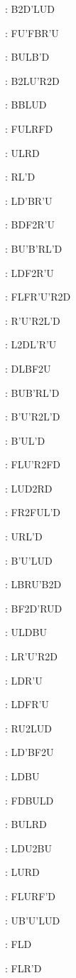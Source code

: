 \documentclass[9pt]{article}
\begin{document}
{\begin{multicols}{6}
: B2D'LUD

: FU'FBR'U

: BULB'D

: B2LU'R2D

: BBLUD

: FULRFD

: ULRD

: RL'D

: LD'BR'U

: BDF2R'U

: BU'B'RL'D

: LDF2R'U

: FLFR'U'R2D

: R'U'R2L'D

: L2DL'R'U

: DLBF2U

: BUB'RL'D

: B'U'R2L'D

: B'UL'D

: FLU'R2FD

: LUD2RD

: FR2FUL'D

: URL'D

: B'U'LUD

: LBRU'B2D

: BF2D'RUD

: ULDBU

: LR'U'R2D

: LDR'U

: LDFR'U

: RU2LUD

: LD'BF2U

: LDBU

: FDBULD

: BULRD

: LDU2BU

: LURD

: FLURF'D

: UB'U'LUD

: FLD

: FLR'D


\end{multicols}}
\end{document}

